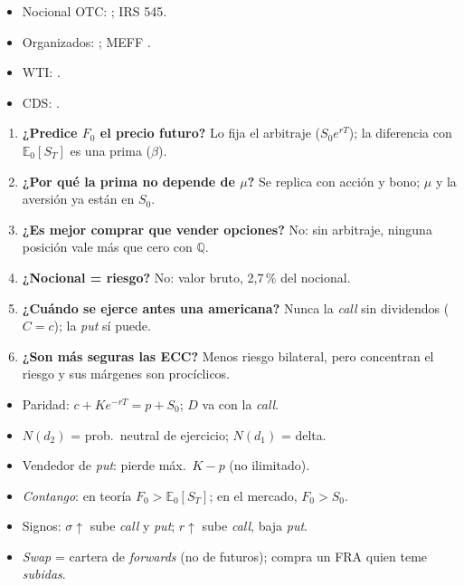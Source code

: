 \documentclass{article}
\begin{document}
\begin{columnas}
\anexorepaso
{}
\begin{itemize}
\item Nocional OTC: ; IRS 545.
\item Organizados: ; MEFF .
\item WTI: .
\item CDS: .
\end{itemize}
\begin{enumerate}
\item \textbf{¿Predice $F_0$ el precio futuro?} Lo fija el arbitraje ($S_0e^{rT}$); la diferencia con $\mathbb{E}_0[S_T]$ es una prima ($\beta$).
\item \textbf{¿Por qué la prima no depende de $\mu$?} Se replica con acción y bono; $\mu$ y la aversión ya están en $S_0$.
\item \textbf{¿Es mejor comprar que vender opciones?} No: sin arbitraje, ninguna posición vale más que cero con $\mathbb{Q}$.
\item \textbf{¿Nocional = riesgo?} No: valor bruto, 2,7\,\% del nocional.
\item \textbf{¿Cuándo se ejerce antes una americana?} Nunca la \emph{call} sin dividendos ($C=c$); la \emph{put} sí puede.
\item \textbf{¿Son más seguras las ECC?} Menos riesgo bilateral, pero concentran el riesgo y sus márgenes son procíclicos.
\end{enumerate}
\begin{trampa}
\begin{itemize}
\item Paridad: $c+Ke^{-rT}=p+S_0$; $D$ va con la \emph{call}.
\item $N(d_2)$ = prob.\ neutral de ejercicio; $N(d_1)$ = delta.
\item Vendedor de \emph{put}: pierde máx.\ $K-p$ (no ilimitado).
\item \emph{Contango}: en teoría $F_0>\mathbb{E}_0[S_T]$; en el mercado, $F_0>S_0$.
\item Signos: $\sigma\uparrow$ sube \emph{call} y \emph{put}; $r\uparrow$ sube \emph{call}, baja \emph{put}.
\item \emph{Swap} = cartera de \emph{forwards} (no de futuros); compra un FRA quien teme \emph{subidas}.
\end{itemize}
\end{trampa}

\end{columnas}
\end{document}
